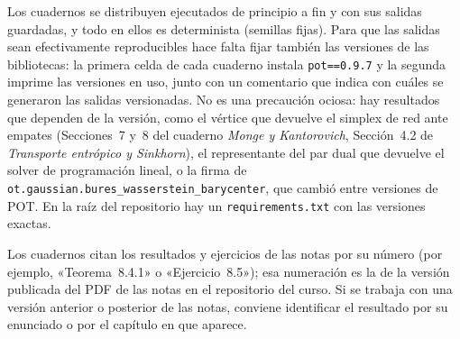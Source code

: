 \documentclass[12pt, a4paper]{amsbook}
\theoremstyle{remark}
\theoremstyle{definition}
\numberwithin{section}{chapter}
\numberwithin{subsection}{section}
\numberwithin{equation}{section}
\numberwithin{figure}{chapter}
\begin{document}
Los cuadernos se distribuyen ejecutados de principio a fin y con sus salidas
guardadas, y todo en ellos es determinista (semillas fijas). Para que las
salidas sean efectivamente reproducibles hace falta fijar también las
versiones de las bibliotecas: la primera celda de cada cuaderno instala
\texttt{pot==0.9.7} y la segunda imprime las versiones en uso, junto con un
comentario que indica con cuáles se generaron las salidas versionadas. No es
una precaución ociosa: hay resultados que dependen de la versión, como el
vértice que devuelve el simplex de red ante empates (Secciones~7 y~8 del
cuaderno \emph{Monge y Kantorovich}, Sección~4.2 de \emph{Transporte
entrópico y Sinkhorn}), el representante del par dual que devuelve el
solver de programación lineal, o la firma de
\texttt{ot.gaussian.bures\_wasserstein\_barycenter}, que cambió entre
versiones de POT. En la raíz del repositorio hay un \texttt{requirements.txt}
con las versiones exactas.

Los cuadernos citan los resultados y ejercicios de las notas por su número
(por ejemplo, «Teorema~8.4.1» o «Ejercicio~8.5»); esa numeración es la de la
versión publicada del PDF de las notas en el repositorio del curso. Si se
trabaja con una versión anterior o posterior de las notas, conviene
identificar el resultado por su enunciado o por el capítulo en que aparece.

\backmatter



\end{document}
